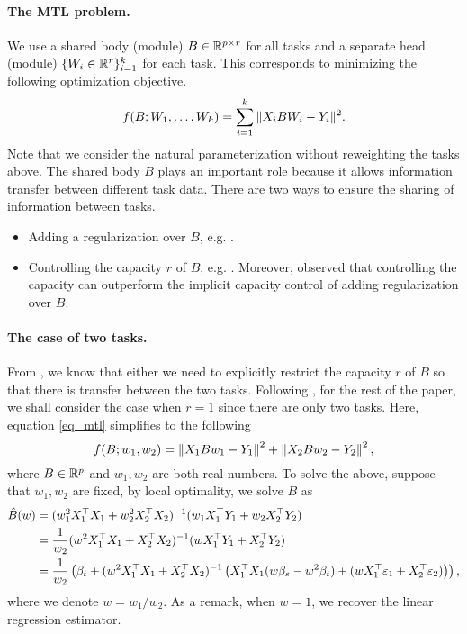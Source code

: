\paragraph{The MTL problem.}
We use a shared body (module) $B\in\mathbb{R}^{p\times r}$ for all tasks and a separate head (module) $\{W_i \in \mathbb{R}^{r}\}_{i=1}^k$ for each task.
This corresponds to minimizing the following optimization objective.
\begin{align}
	\label{eq_mtl}
	f(B; W_1, \dots, W_k) = \sum_{i=1}^k \|X_i B W_i - Y_i\|^2.
\end{align}
Note that we consider the natural parameterization without reweighting the tasks above.
The shared body $B$ plays an important role because it allows information transfer between different task data.
There are two ways to ensure the sharing of information between tasks.
\begin{itemize}
	\item Adding a regularization over $B$, e.g. \cite{LPTV09,LPVT11}.
	\item Controlling the capacity $r$ of $B$, e.g. \cite{KD12,WZR20}. Moreover, \cite{KD12} observed that controlling the capacity can outperform the implicit capacity control of adding regularization over $B$.
\end{itemize}

\paragraph{The case of two tasks.}
From \cite{WZR20}, we know that either we need to explicitly restrict the capacity $r$ of $B$ so that there is transfer between the two tasks.
Following \cite{WZR20}, for the rest of the paper, we shall consider the case when $r=1$ since there are only two tasks.
Here, equation \eqref{eq_mtl} simplifies to the following
\[ f(B; w_1, w_2) = \left\| X_1 B w_1 - Y_1 \right\|^2 + \left\| X_2 B w_2 - Y_2 \right\|^2, \]
where $B\in\mathbb{R}^p$ and $w_1, w_2$ are both real numbers.
To solve the above, suppose that $w_1, w_2$ are fixed, by local optimality, we solve $B$ as
\begin{align*}
	\hat{B}(w) &= (w_1^2 X_1^{\top}X_1 + w_2^2 X_2^{\top}X_2)^{-1} (w_1 X_1^{\top}Y_1 + w_2 X_2^{\top}Y_2) \\
	&= \frac{1}{w_2} (w^2 X_1^{\top}X_1 + X_2^{\top}X_2)^{-1} (w X_1^{\top}Y_1 + X_2^{\top}Y_2) \\
	&= \frac{1}{w_2}\left({\beta_t + (w^2 X_1^{\top}X_1 + X_2^{\top}X_2)^{-1}\left({X_1^{\top}X_1(w\beta_s - w^2\beta_t) + (w X_1^{\top}\varepsilon_1 + X_2^{\top}\varepsilon_2)}\right)}\right),
\end{align*}
where we denote $w = w_1 / w_2$.
As a remark, when $w = 1$, we recover the linear regression estimator.

